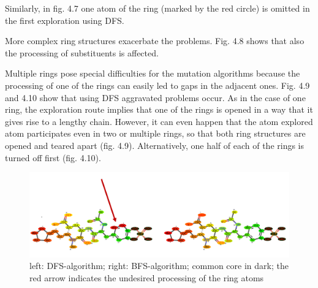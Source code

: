 Similarly, in fig. 4.7 one atom of the ring (marked by the red circle)
is omitted in the first exploration using DFS.

More complex ring structures exacerbate the problems. Fig. 4.8 shows that also the processing of substituents is affected.

Multiple rings pose special difficulties for the mutation algorithms because
the processing of one of the rings can easily led to gaps in the adjacent
ones. Fig. 4.9 and 4.10 show that using DFS aggravated problems occur.
As in the case of one ring, the exploration route implies that one
of the rings is opened in a way that it gives rise to a lengthy chain.
However, it can even happen that the atom explored atom participates
even in two or multiple rings, so that both ring structures are opened
and teared apart (fig. 4.9). Alternatively, one half of each of the
rings is turned off first (fig. 4.10). 

\begin{figure}
\includegraphics[scale=0.4]{simple_ring_exampledfs2}\caption{left: DFS-algorithm; right: BFS-algorithm; common core in dark; the
red arrow indicates the undesired processing of the ring atoms}

\end{figure}

